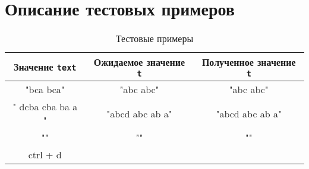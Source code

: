 \section{Описание тестовых примеров}

\begin{table}[H]
  \centering
  \begin{tabular}{|| c | c | c ||}
    \hline
    Значение \texttt{text} & Ожидаемое значение \texttt{t} & Полученное значение \texttt{t} \\
    \hline\hline
    "bca bca" & "abc abc" & "abc abc" \\
    \hline
    "   dcba    cba ba    a    " & "abcd abc ab a" & "abcd abc ab a" \\
    \hline
    "" & "" & "" \\
    \hline
    ctrl + d &  &  \\
    \hline
  \end{tabular}
  \caption{Тестовые примеры}
\end{table}